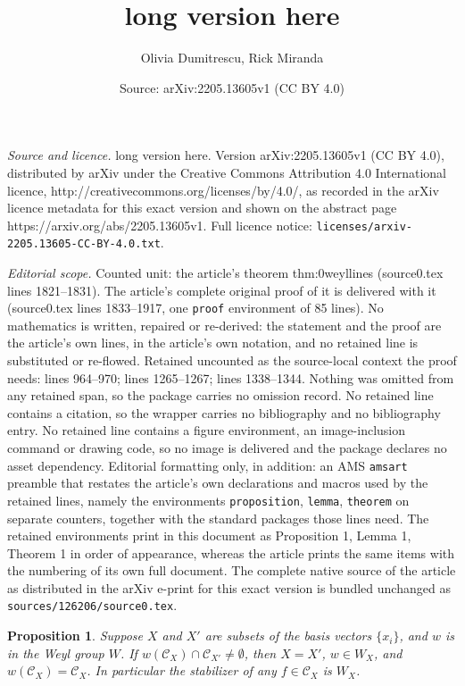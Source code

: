 \documentclass[10pt,a4paper]{amsart}
\title{long version here}
\author{Olivia Dumitrescu, Rick Miranda}
\date{Source: arXiv:2205.13605v1 (CC BY 4.0)}
\newtheorem{proposition}{Proposition}
\begin{document}
\maketitle

\noindent\emph{Source and licence.} long version here. Version arXiv:2205.13605v1 (CC BY 4.0), distributed by arXiv under the Creative Commons Attribution 4.0 International licence, http://creativecommons.org/licenses/by/4.0/, as recorded in the arXiv licence metadata for this exact version and shown on the abstract page https://arxiv.org/abs/2205.13605v1. Full licence notice: \texttt{licenses/arxiv-2205.13605-CC-BY-4.0.txt}.\par\smallskip

\noindent\textit{Editorial scope.} Counted unit: the article's theorem thm:0weyllines (source0.tex lines 1821--1831). The article's complete original proof of it is delivered with it (source0.tex lines 1833--1917, one \texttt{proof} environment of 85 lines). No mathematics is written, repaired or re-derived: the statement and the proof are the article's own lines, in the article's own notation, and no retained line is substituted or re-flowed.  Retained uncounted as the source-local context the proof needs: lines 964--970; lines 1265--1267; lines 1338--1344.  Nothing was omitted from any retained span, so the package carries no omission record.  No retained line contains a citation, so the wrapper carries no bibliography and no bibliography entry.  No retained line contains a figure environment, an image-inclusion command or drawing code, so no image is delivered and the package declares no asset dependency.  Editorial formatting only, in addition: an AMS \texttt{amsart} preamble that restates the article's own declarations and macros used by the retained lines, namely the environments \texttt{proposition}, \texttt{lemma}, \texttt{theorem} on separate counters, together with the standard packages those lines need.  The retained environments print in this document as Proposition 1, Lemma 1, Theorem 1 in order of appearance, whereas the article prints the same items with the numbering of its own full document.  The complete native source of the article as distributed in the arXiv e-print for this exact version is bundled unchanged as \texttt{sources/126206/source0.tex}.
\begin{proposition}\label{CXprop}
Suppose $X$ and $X'$ are subsets of the basis vectors $\{x_i\}$,
and $w$ is in the Weyl group $W$.
If $w(\mathcal{C}_X) \cap \mathcal{C}_{X'} \neq \emptyset$,
then $X=X'$,  $w \in W_X$, and $w(\mathcal{C}_X) = \mathcal{C}_{X}$.
In particular the stabilizer of any $f \in \mathcal{C}_X$ is $W_X$.
\end{proposition}
\end{document}
